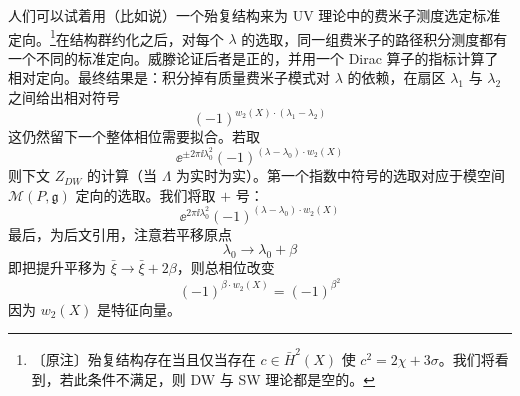 
人们可以试着用（比如说）一个殆复结构来为 UV 理论中的费米子测度选定标准定向。\footnote{〔原注〕殆复结构存在当且仅当存在 $c\in\bar H^{2}(X)$ 使 $c^{2}=2\chi+3\sigma$。我们将看到，若此条件不满足，则 DW 与 SW 理论都是空的。}在结构群约化之后，对每个 $\lambda$ 的选取，同一组费米子的路径积分测度都有一个不同的标准定向。威滕论证后者是正的，并用一个 Dirac 算子的指标计算了相对定向。最终结果是：积分掉有质量费米子模式对 $\lambda$ 的依赖，在扇区 $\lambda_{1}$ 与 $\lambda_{2}$ 之间给出相对符号
\begin{equation}
(-1)^{w_{2}(X)\cdot(\lambda_{1}-\lambda_{2})}
\tag{5.71}
\end{equation}
这仍然留下一个整体相位需要拟合。若取
\begin{equation}
\ee^{\pm2\pi\ii\lambda_{0}^{2}}(-1)^{(\lambda-\lambda_{0})\cdot w_{2}(X)}
\tag{5.72}
\end{equation}
则下文 $Z_{DW}$ 的计算（当 $\Lambda$ 为实时为实）。第一个指数中符号的选取对应于模空间 $\mathcal{M}(P,\mathfrak{g})$ 定向的选取。我们将取 $+$ 号：
\begin{equation}
\ee^{2\pi\ii\lambda_{0}^{2}}(-1)^{(\lambda-\lambda_{0})\cdot w_{2}(X)}
\tag{5.73}
\end{equation}
最后，为后文引用，注意若平移原点
\begin{equation}
\lambda_{0}\to\lambda_{0}+\beta
\tag{5.74}
\end{equation}
即把提升平移为 $\bar\xi\to\bar\xi+2\beta$，则总相位改变
\begin{equation}
(-1)^{\beta\cdot w_{2}(X)}=(-1)^{\beta^{2}}
\tag{5.75}
\end{equation}
因为 $w_{2}(X)$ 是特征向量。

